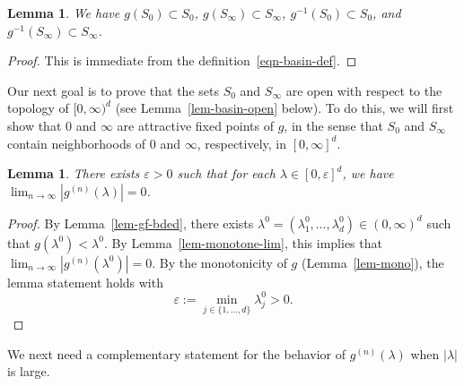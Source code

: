 \documentclass[11pt]{article}
\theoremstyle{plain}
\newtheorem{lem}[thm]{Lemma}
\theoremstyle{definition}
\numberwithin{equation}{section}
\newcommand{\eqbn}{\begin{equation*}}
\newcommand{\eqen}{\end{equation*}}
\newcommand{\ep}{\varepsilon}
\begin{document}
\begin{lem} \label{lem-basin-closed}
We have $g(S_0)\subset S_0$, $g(S_\infty) \subset S_\infty$, $g^{-1}(S_0)\subset S_0$, and $g^{-1}(S_\infty) \subset S_\infty$. 
\end{lem}
\begin{proof}
This is immediate from the definition~\eqref{eqn-basin-def}. 
\end{proof}

Our next goal is to prove that the sets $S_0$ and $S_\infty$ are open with respect to the topology of $[0,\infty)^d$ (see Lemma~\ref{lem-basin-open} below). 
To do this, we will first show that $0$ and $\infty$ are attractive fixed points of $g$, in the sense that $S_0$ and $S_\infty$ contain neighborhoods of $0$ and $\infty$, respectively, in $[0,\infty]^d$.


\begin{lem} \label{lem-attractive-zero}
There exists $\ep > 0$ such that for each $\lambda \in [0,\ep]^d$, we have $\lim_{n\to\infty} |g^{(n)}(\lambda)| = 0$. 
\end{lem}
\begin{proof}
By Lemma~\ref{lem-gf-bded}, there exists $\lambda^0 = (\lambda_1^0,\dots,\lambda_d^0) \in (0,\infty)^d$ such that $g(\lambda^0) < \lambda^0$. By Lemma~\ref{lem-monotone-lim}, this implies that $\lim_{n\to\infty} |g^{(n)}(\lambda^0)| = 0$. 
By the monotonicity of $g$ (Lemma~\ref{lem-mono}), the lemma statement holds with
\eqbn
\ep := \min_{j\in \{1,\dots,d\}} \lambda_j^0 > 0 . 
\eqen 
\end{proof}


We next need a complementary statement for the behavior of $g^{(n)}(\lambda)$ when $|\lambda|$ is large. 
\end{document}
